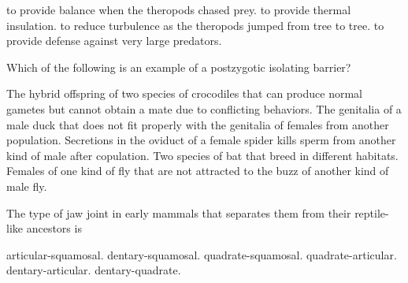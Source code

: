 \begin{choices}
\choice to provide balance when the theropods chased prey. 
\correctchoice to provide thermal insulation. 
\choice to reduce turbulence as the theropods jumped from tree to tree. 
\choice to provide defense against very large predators. 
\end{choices}

\question
Which of the following is an example of a postzygotic isolating barrier?

\begin{choices}
\correctchoice The hybrid offspring of two species of crocodiles that can produce normal gametes but cannot obtain a mate due to conflicting behaviors. 
\choice The genitalia of a male duck that does not fit properly with the genitalia of females from another population. 
\choice Secretions in the oviduct of a female spider kills sperm from another kind of male after copulation.  
\choice Two species of bat that breed in different habitats.
\choice Females of one kind of fly that are not attracted to the buzz of another kind of male fly. 
\end{choices}

\question
The type of jaw joint in early mammals that separates them from their reptile-like ancestors is 
\begin{choices}
\choice articular-squamosal. 
\correctchoice dentary-squamosal. 
\choice quadrate-squamosal. 
\choice quadrate-articular. 
\choice dentary-articular. 
\choice dentary-quadrate. 
\end{choices}
